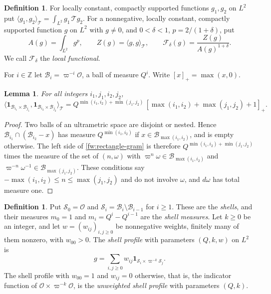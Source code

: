 \documentclass[11pt]{amsart}
\numberwithin{equation}{section}
\newtheorem{lemma}[equation]{Lemma}
\theoremstyle{definition}
\newtheorem{definition}[equation]{Definition}
\theoremstyle{remark}
\newcommand{\Z}{\mathbb Z}
\begin{document}
\begin{definition}\label{fw:local-functional}
For locally constant, compactly supported functions $g_1,g_2$ on $L^2$
put $\langle g_1,g_2\rangle_{\mathcal T}=\int_{L^2}g_1\,\mathcal Tg_2$.
For a nonnegative, locally constant, compactly supported function $g$
on $L^2$ with $g\ne0$, and $0<\delta<1$, $p=2/(1+\delta)$, put
\begin{equation}\label{fw:functional}
 A(g)=\int_{L^2}g^p,\qquad Z(g)=\langle g,g\rangle_{\mathcal T},\qquad
 \mathcal F_\delta(g)=\frac{Z(g)}{A(g)^{1+\delta}} .
\end{equation}
We call $\mathcal F_\delta$ the \emph{local functional}.
\end{definition}

For $i\in\Z$ let $\mathcal B_i=\varpi^{-i}\mathcal O$, a ball of measure
$Q^i$. Write $[x]_+=\max(x,0)$.

\begin{lemma}\label{fw:gram-lemma}
For all integers $i_1,j_1,i_2,j_2$,
\begin{equation}\label{fw:rectangle-gram}
 \bigl\langle\mathbf 1_{\mathcal B_{i_1}\times\mathcal B_{j_1}},
 \mathbf 1_{\mathcal B_{i_2}\times\mathcal B_{j_2}}\bigr\rangle_{\mathcal T}
 =Q^{\min(i_1,i_2)+\min(j_1,j_2)}\,
 [\max(i_1,i_2)+\max(j_1,j_2)+1]_+.
\end{equation}
\end{lemma}

\begin{proof}
Two balls of an ultrametric space are disjoint or nested. Hence
$\mathcal B_{i_1}\cap(\mathcal B_{i_2}-x)$ has measure
$Q^{\min(i_1,i_2)}$ if $x\in\mathcal B_{\max(i_1,i_2)}$, and is empty
otherwise. The left side of \eqref{fw:rectangle-gram} is therefore
$Q^{\min(i_1,i_2)+\min(j_1,j_2)}$ times the measure of the set of
$(n,\omega)$ with $\varpi^n\omega\in\mathcal B_{\max(i_1,i_2)}$ and
$\varpi^{-n}\omega^{-1}\in\mathcal B_{\max(j_1,j_2)}$. These conditions
say $-\max(i_1,i_2)\le n\le\max(j_1,j_2)$ and do not involve $\omega$,
and $d\omega$ has total measure one.
\end{proof}

\begin{definition}\label{fw:shell-profile}
Put $\mathcal S_0=\mathcal O$ and $\mathcal S_i=\mathcal B_i\setminus
\mathcal B_{i-1}$ for $i\ge1$. These are the \emph{shells}, and their
measures $m_0=1$ and $m_i=Q^i-Q^{i-1}$ are the \emph{shell measures}.
Let $k\ge0$ be an integer, and let $w=(w_{ij})_{i,j\ge0}$ be nonnegative
weights, finitely many of them nonzero, with $w_{00}>0$. The
\emph{shell profile} with parameters $(Q,k,w)$ on $L^2$ is
\[
 g=\sum_{i,j\ge0}w_{ij}\mathbf 1_{\mathcal S_i\times\varpi^{-k}\mathcal S_j}.
\]
The shell profile with $w_{00}=1$ and $w_{ij}=0$ otherwise, that is, the
indicator function of $\mathcal O\times\varpi^{-k}\mathcal O$, is the
\emph{unweighted shell profile} with parameters $(Q,k)$.
\end{definition}
\end{document}
